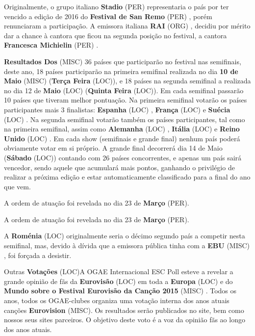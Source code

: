 \documentclass[12pt,a4paper]{article}
\begin{document}
Originalmente, o grupo italiano \textbf{Stadio} (PER) representaria o país por ter vencido a edição de 2016 do \textbf{Festival de San Remo} (PER) , porém renunciaram a participação. A emissora italiana \textbf{RAI} (ORG) , decidiu por mérito dar a chance à cantora que ficou na segunda posição no festival, a cantora \textbf{Francesca Michielin} (PER) .



\textbf{Resultados Dos} (MISC) 36 países que participarão no festival nas semifinais, deste ano, 18 países participarão na primeira semifinal realizada no dia \textbf{10 de Maio} (MISC) (\textbf{Terça Feira} (LOC)), e 18 países na segunda semifinal a realizada no dia 12 de \textbf{Maio} (LOC) (\textbf{Quinta Feira} (LOC)). Em cada semifinal passarão 10 países que tiveram melhor pontuação. Na primeira semifinal votarão os países participantes mais 3 finalistas: \textbf{Espanha} (LOC) , \textbf{França} (LOC) e \textbf{Suécia} (LOC) . Na segunda semifinal votarão também os países participantes, tal como na primeira semifinal, assim como \textbf{Alemanha} (LOC) , \textbf{Itália} (LOC) e \textbf{Reino Unido} (LOC) . Em cada show (semifinais e grande final) nenhum país poderá obviamente votar em si próprio. A grande final decorrerá dia 14 de Maio (\textbf{Sábado} (LOC)) contando com 26 países concorrentes, e apenas um país sairá vencedor, sendo aquele que acumulará mais pontos, ganhando o privilégio de realizar a próxima edição e estar automaticamente classificado para a final do ano que vem.

A ordem de atuação foi revelada no dia 23 de \textbf{Março} (PER).

A ordem de atuação foi revelada no dia 23 de \textbf{Março} (PER).

A \textbf{Roménia} (LOC) originalmente seria o décimo segundo país a competir nesta semifinal, mas, devido à dívida que a emissora pública tinha com a \textbf{EBU} (MISC) , foi forçada a desistir.



Outras \textbf{Votações} (LOC)A OGAE Internacional ESC Poll esteve a revelar a grande opinião de fãs da \textbf{Eurovisão} (LOC) em toda a \textbf{Europa} (LOC) e do \textbf{Mundo sobre o Festival Eurovisão da Canção 2015} (MISC) . Todos os anos, todos os OGAE-clubes organiza uma votação interna dos anos atuais canções \textbf{Eurovision} (MISC). Os resultados serão publicados no site, bem como nossos seus sites parceiros. O objetivo deste voto é a voz da opinião fãs ao longo dos anos atuais.
\end{document}
